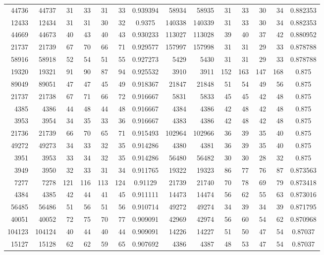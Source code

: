 \documentclass[10pt,twocolumn]{article}
\begin{document}
\begin{table}[t]
\begin{tabular}{rrrrrrc@{\hspace{1em}}rrrrrrc}
44736 & 44737 & 31 & 33 & 31 & 33 & 0.939394 & 58934 & 58935 & 31 & 33 & 30 & 34 & 0.882353 \\
12433 & 12434 & 31 & 31 & 30 & 32 & 0.9375 & 140338 & 140339 & 31 & 33 & 30 & 34 & 0.882353 \\
44669 & 44673 & 40 & 43 & 40 & 43 & 0.930233 & 113027 & 113028 & 39 & 40 & 37 & 42 & 0.880952 \\
21737 & 21739 & 67 & 70 & 66 & 71 & 0.929577 & 157997 & 157998 & 31 & 31 & 29 & 33 & 0.878788 \\
58916 & 58918 & 52 & 54 & 51 & 55 & 0.927273 & 5429 & 5430 & 31 & 31 & 29 & 33 & 0.878788 \\
19320 & 19321 & 91 & 90 & 87 & 94 & 0.925532 & 3910 & 3911 & 152 & 163 & 147 & 168 & 0.875 \\
89049 & 89051 & 47 & 47 & 45 & 49 & 0.918367 & 21847 & 21848 & 51 & 54 & 49 & 56 & 0.875 \\
21737 & 21738 & 67 & 71 & 66 & 72 & 0.916667 & 5831 & 5833 & 45 & 45 & 42 & 48 & 0.875 \\
4385 & 4386 & 44 & 48 & 44 & 48 & 0.916667 & 4384 & 4386 & 42 & 48 & 42 & 48 & 0.875 \\
3953 & 3954 & 34 & 35 & 33 & 36 & 0.916667 & 4383 & 4386 & 42 & 48 & 42 & 48 & 0.875 \\
21736 & 21739 & 66 & 70 & 65 & 71 & 0.915493 & 102964 & 102966 & 36 & 39 & 35 & 40 & 0.875 \\
49272 & 49273 & 34 & 33 & 32 & 35 & 0.914286 & 4380 & 4381 & 36 & 39 & 35 & 40 & 0.875 \\
3951 & 3953 & 33 & 34 & 32 & 35 & 0.914286 & 56480 & 56482 & 30 & 30 & 28 & 32 & 0.875 \\
3949 & 3950 & 32 & 33 & 31 & 34 & 0.911765 & 19322 & 19323 & 86 & 77 & 76 & 87 & 0.873563 \\
7277 & 7278 & 121 & 116 & 113 & 124 & 0.91129 & 21739 & 21740 & 70 & 78 & 69 & 79 & 0.873418 \\
4384 & 4385 & 42 & 44 & 41 & 45 & 0.911111 & 14473 & 14474 & 56 & 62 & 55 & 63 & 0.873016 \\
56485 & 56486 & 51 & 56 & 51 & 56 & 0.910714 & 49272 & 49274 & 34 & 39 & 34 & 39 & 0.871795 \\
40051 & 40052 & 72 & 75 & 70 & 77 & 0.909091 & 42969 & 42974 & 56 & 60 & 54 & 62 & 0.870968 \\
104123 & 104124 & 40 & 44 & 40 & 44 & 0.909091 & 14226 & 14227 & 51 & 50 & 47 & 54 & 0.87037 \\
15127 & 15128 & 62 & 62 & 59 & 65 & 0.907692 & 4386 & 4387 & 48 & 53 & 47 & 54 & 0.87037 \\

\end{tabular}
\end{table}
\end{document}
